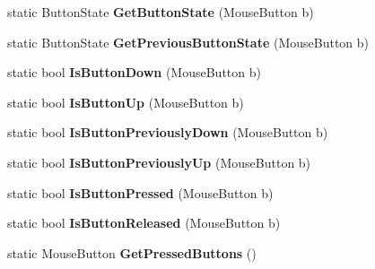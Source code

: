 \begin{DoxyCompactItemize}
static Button\+State {\bfseries Get\+Button\+State} (Mouse\+Button b)
\item 
\mbox{\label{class_n_g_sim_1_1_input_1_1_input_manager_aa034545034414d0ee9bdf0e7bddd6f6a}} 
static Button\+State {\bfseries Get\+Previous\+Button\+State} (Mouse\+Button b)
\item 
\mbox{\label{class_n_g_sim_1_1_input_1_1_input_manager_a96edf88bba9395f6f001222ef549d05e}} 
static bool {\bfseries Is\+Button\+Down} (Mouse\+Button b)
\item 
\mbox{\label{class_n_g_sim_1_1_input_1_1_input_manager_a9a9367167f578e0db9a65282288f2e63}} 
static bool {\bfseries Is\+Button\+Up} (Mouse\+Button b)
\item 
\mbox{\label{class_n_g_sim_1_1_input_1_1_input_manager_a637cb3f11cbaf1d8876ca5e4a2e9627a}} 
static bool {\bfseries Is\+Button\+Previously\+Down} (Mouse\+Button b)
\item 
\mbox{\label{class_n_g_sim_1_1_input_1_1_input_manager_a2bca583fcc63fa48d1d80c5a70ce7793}} 
static bool {\bfseries Is\+Button\+Previously\+Up} (Mouse\+Button b)
\item 
\mbox{\label{class_n_g_sim_1_1_input_1_1_input_manager_a6998b6f83b67c510431199085fd260b4}} 
static bool {\bfseries Is\+Button\+Pressed} (Mouse\+Button b)
\item 
\mbox{\label{class_n_g_sim_1_1_input_1_1_input_manager_af0fb50bc4baec02d2fb9b62ea1089235}} 
static bool {\bfseries Is\+Button\+Released} (Mouse\+Button b)
\item 
\mbox{\label{class_n_g_sim_1_1_input_1_1_input_manager_af951e6821e7c01b0be52a9f60551d1e5}} 
static Mouse\+Button {\bfseries Get\+Pressed\+Buttons} ()
\item 
\mbox{\label{class_n_g_sim_1_1_input_1_1_input_manager_a40f8c6ec8d2406cbcb7b406e8f223e1a}} 

\end{DoxyCompactItemize}
